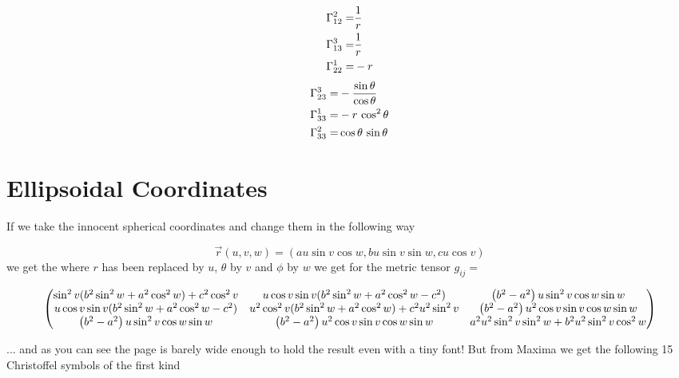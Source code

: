 \begin{twocol}{
\begin{eqnarray*}
\Gamma_{12}^{2}=&\frac{1}{r} \\
\Gamma_{13}^{3}=&\frac{1}{r} \\
\Gamma_{22}^{1}=&-r \\
\end{eqnarray*}}{
\begin{eqnarray*}
\Gamma_{23}^{3}=&-\frac{\sin \theta}{\cos \theta} \\
\Gamma_{33}^{1}=&-r\,\cos ^2\theta \\
\Gamma_{33}^{2}=&\cos \theta\,\sin \theta \\
\end{eqnarray*}}
\end{twocol}{


\section{Ellipsoidal Coordinates}
If we take the innocent spherical coordinates and change them in the following way

$$
   \vec{r}(u,v,w) = (a u \sin v \cos w, bu\sin v \sin w, c u \cos v)
$$
we get the 
where $r$ has been replaced by $u$, $\theta$ by $v$ and $\phi$ by $w$ we get for the 
metric tensor $g_{ij}=$


\begin{wide}
$$
   \begin{pmatrix}

  \sin^2v(b^2\sin ^2w+a^2\cos ^2w)+c^2\cos ^2v   &
  u\cos v \sin v(b^2\sin ^2w+a^2\cos ^2 w-c^2)  &
  \left(b^2-a^2\right)u\sin ^2v\cos w \sin w\cr 

  u\cos v \sin v(b^2\sin ^2w+a^2 \cos ^2w-c^2)  &
  u^2\cos^2v(b^2\sin ^2w+a^2\cos ^2w)+c^2u^2\sin ^2v  &
  \left(b^2-a^2\right)u^2 \cos v\sin v\cos w\sin w\cr 

  \left(b^2-a^2\right)u\sin ^2v \cos w\sin w   &
  \left(b^2-a^2\right)u^2\cos v\sin v\cos w \sin w   &
   a^2u^2\sin ^2v\sin ^2w+b^2u^2\sin ^2v\cos ^2w\cr 
   \end{pmatrix}
$$
\end{wide}
... and as you can see the page is barely wide enough to hold the result even with a tiny font!  But from
Maxima we get the following 15 Christoffel symbols of the first kind

}
